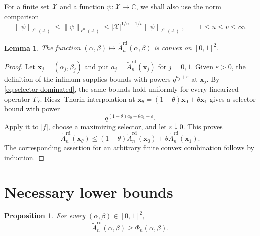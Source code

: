\documentclass[11pt,letterpaper]{amsart}
\numberwithin{equation}{section}
\newtheorem{proposition}[proposition]{Proposition}
\newtheorem{lemma}[lemma]{Lemma}
\theoremstyle{definition}
\theoremstyle{remark}
\newcommand{\C}{\mathbb C}
\newcommand{\norm}[1]{\lVert #1\rVert}
\begin{document}
For a finite set $\mathcal X$ and a function
$\psi:\mathcal X\to\C$, we shall also use the norm comparison
\begin{equation}\label{eq:finite-norm-comparison}
 \norm{\psi}_{\ell^v(\mathcal X)}
 \leq\norm{\psi}_{\ell^u(\mathcal X)}
 \leq |\mathcal X|^{1/u-1/v}\norm{\psi}_{\ell^v(\mathcal X)},
 \qquad 1\leq u\leq v\leq\infty.
\end{equation}


\begin{lemma}
\label{lem:convexity}
The function $(\alpha,\beta)\mapsto
\widetilde A_n^{\mathrm{rd}}(\alpha,\beta)$ is
convex on $[0,1]^2$.
\end{lemma}

\begin{proof}
Let $\mathbf x_j=(\alpha_j,\beta_j)$ and put
$a_j=\widetilde A_n^{\mathrm{rd}}(\mathbf x_j)$ for $j=0,1$. Given
$\varepsilon>0$, the definition of the infimum supplies bounds with powers $q^{a_j+\varepsilon}$ at $\mathbf x_j$. By \eqref{eq:selector-dominated}, the same bounds hold uniformly for every linearized operator $T_{\mathcal S}$. Riesz--Thorin interpolation at $\mathbf x_\theta=(1-\theta)\mathbf x_0+\theta\mathbf x_1$ gives a selector bound with power
\[
 q^{(1-\theta)a_0+\theta a_1+\varepsilon}.
\]
Apply it to $|f|$, choose a maximizing selector, and let
$\varepsilon\downarrow0$.
This proves 
\[
 \widetilde A_n^{\mathrm{rd}}(\mathbf x_\theta)
 \leq(1-\theta)\widetilde A_n^{\mathrm{rd}}(\mathbf x_0)
       +\theta\widetilde A_n^{\mathrm{rd}}(\mathbf x_1).
\]
The corresponding assertion for an arbitrary finite convex combination follows by induction.
\end{proof}




\section{Necessary lower bounds}
\label{sec:lower-bounds}

\begin{proposition}\label{prop:lower-bounds}
For every $(\alpha,\beta)\in[0,1]^2$,
\begin{equation}\label{eq:lower-bounds}
 \widetilde A_n^{\mathrm{rd}}(\alpha,\beta)
 \geq\Phi_n(\alpha,\beta).
\end{equation}
\end{proposition}
\end{document}
